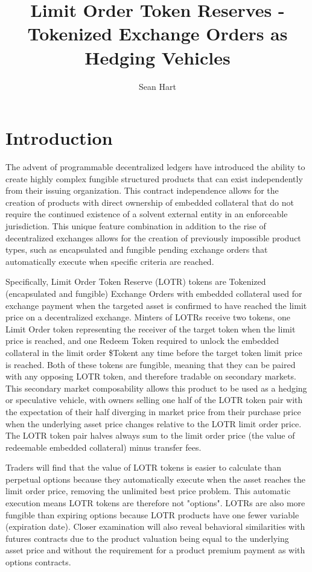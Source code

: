 \documentclass[12pt]{article}
\title{Limit Order Token Reserves - Tokenized Exchange Orders as Hedging Vehicles}
\author{Sean Hart}
\begin{document}
   \maketitle

   \begin{abstract}

   \end{abstract}

   \section*{Introduction}
   The advent of programmable decentralized ledgers have introduced the ability to create highly complex fungible structured products that can exist independently from their issuing organization. This contract independence allows for the creation of products with direct ownership of embedded collateral that do not require the continued existence of a solvent external entity in an enforceable jurisdiction. This unique feature combination in addition to the rise of decentralized exchanges allows for the creation of previously impossible product types, such as encapsulated and fungible pending exchange orders that automatically execute when specific criteria are reached.

   Specifically, Limit Order Token Reserve (LOTR) tokens are Tokenized (encapsulated and fungible) Exchange Orders with embedded collateral used for exchange payment when the targeted asset is confirmed to have reached the limit price on a decentralized exchange. Minters of LOTRs receive two tokens, one Limit Order token representing the receiver of the target token when the limit price is reached, and one Redeem Token required to unlock the embedded collateral in the limit order \$Tokent any time before the target token limit price is reached. Both of these tokens are fungible, meaning that they can be paired with any opposing LOTR token, and therefore tradable on secondary markets. This secondary market composability allows this product to be used as a hedging or speculative vehicle, with owners selling one half of the LOTR token pair with the expectation of their half diverging in market price from their purchase price when the underlying asset price changes relative to the LOTR limit order price. The LOTR token pair halves always sum to the limit order price (the value of redeemable embedded collateral) minus transfer fees.

   Traders will find that the value of LOTR tokens is easier to calculate than perpetual options because they automatically execute when the asset reaches the limit order price, removing the unlimited best price problem. This automatic execution means LOTR tokens are therefore not "options". LOTRs are also more fungible than expiring options because LOTR products have one fewer variable (expiration date). Closer examination will also reveal behavioral similarities with futures contracts due to the product valuation being equal to the underlying asset price and without the requirement for a product premium payment as with options contracts.
\end{document}
